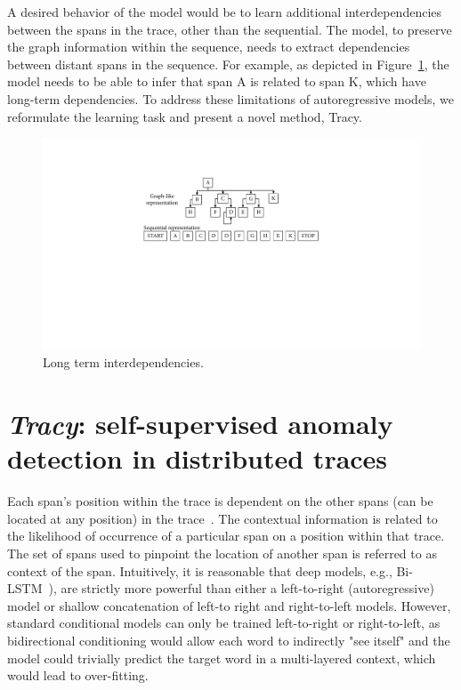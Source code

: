 A desired behavior of the model would be to learn additional interdependencies between the spans in the trace, other than the sequential. The model, to preserve the graph information within the sequence, needs to extract dependencies between distant spans in the sequence. For example, as depicted in Figure~\ref{fig:interdependenciessequential}, the model needs to be able to infer that span A is related to span K, which have long-term dependencies. To address these limitations of autoregressive models, we reformulate the learning task and present a novel method, Tracy.


\begin{figure}[!t]
\centerline{\includegraphics[width=1.0\textwidth]{gfx/chap6/interdependenciessequential.pdf}}
\caption{Long term interdependencies.}
\label{fig:interdependenciessequential}
\end{figure}


\section{\textit{Tracy}: self-supervised anomaly detection in distributed traces}
Each span's position within the trace is dependent on the other spans (can be located at any position) in the trace~\cite{sigelman2010dapper,RepTrace,chow2014mystery}. The contextual information is related to the likelihood of occurrence of a particular span on a position within that trace. The set of spans used to pinpoint the location of another span is referred to as context of the span. Intuitively, it is reasonable that deep models, e.g., Bi-LSTM~\cite{huang2015bidirectional}), are strictly more powerful than either a left-to-right (autoregressive) model or shallow concatenation of left-to right and right-to-left models. However, standard conditional models can only be trained left-to-right or right-to-left, as bidirectional conditioning would allow each word to indirectly "see itself" and the model could trivially predict the target word in a multi-layered context, which would lead to over-fitting.

